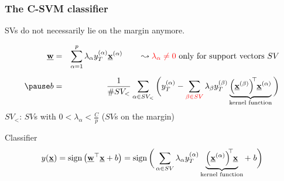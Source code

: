 \begin{frame}\frametitle{The C-SVM classifier}

SVs do not necessarily lie on the margin anymore.

	\begin{eqnarray*}
		\vec{w} &=& \sum\limits_{\alpha = 1}^p \lambda_\alpha y_T^{(\alpha)}
			\vec{x}^{(\alpha)} \qquad
		\leadsto {\color{red}\lambda_\alpha \neq 0} \text{ only for support vectors }SV\\[2mm]
		\pause
		b &=& \frac{1}{\# SV_<} \sum\limits_{\alpha \in SV_<} \bigg( y_T^{(\alpha)}
			- \sum\limits_{\color{red}\beta \in SV} \lambda_\beta y_T^{(\beta)} 
			\underbrace{ \Big( \vec{x}^{(\beta)} \Big)^{\kern-0.6ex\top} 
				\kern-0.2ex\vec{x}^{(\alpha)}}_{\text{kernel function}}
			\bigg)
	\end{eqnarray*}
	\vspace{2mm}
	$SV_<$: $SV$s with $0 < \lambda_\alpha < \frac{C}{p}$ 
	($SV$s on the margin) 
	
	\pause

	\begin{block}{Classifier}
	\begin{equation*}
		y(\underline{\mathbf{x}}) = \operatorname{sign} \big( \underline{\mathbf{w}}^\top \underline{\mathbf{x}} + b \big) 
		= \operatorname{sign} \bigg( \sum\limits_{\alpha \in SV} \lambda_\alpha y_T^{(\alpha)} 
			\underbrace{ \Big( \underline{\mathbf{x}}^{(\alpha)} \Big)^{\kern-0.6ex\top} 
				\kern-0.2ex \underline{\mathbf{x}}}_{
				\text{kernel function}} + \;b
			\bigg)
	\end{equation*}
	\end{block}
\end{frame}
